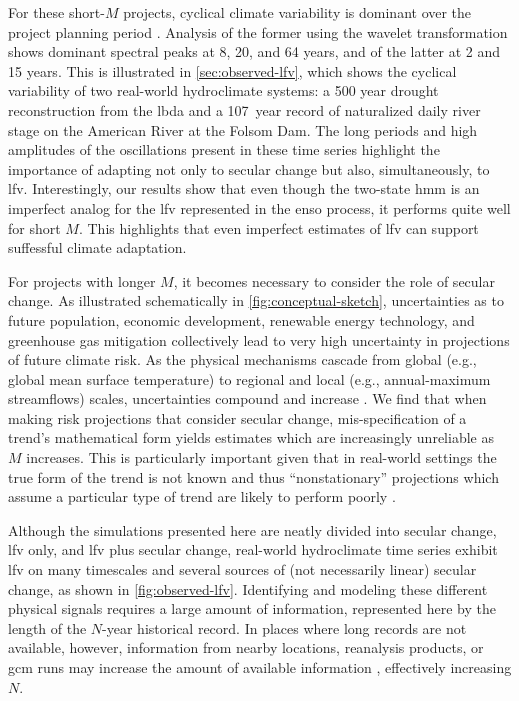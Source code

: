 \documentclass[
]{agujournal2018}
\makeatletter
\newcommand{\eg}{e.g.\@\xspace}
\makeatother
\begin{document}
For these short-$M$ projects, cyclical climate variability is dominant over the project planning period \citep{Hodgkins:2017hw, Jain:2001hz}.
Analysis of the former using the wavelet transformation \citep{Torrence:1998jp} shows dominant spectral peaks at 8, 20, and 64 years, and of the latter at 2 and 15 years.
This is illustrated in \cref{sec:observed-lfv}, which shows the cyclical variability of two real-world hydroclimate systems: a 500 year drought reconstruction from the \gls{lbda} \citep{Cook:2010bz} and a \SI{107}{year} record of naturalized daily river stage on the American River at the Folsom Dam.
The long periods and high amplitudes of the oscillations present in these time series highlight the importance of adapting not only to secular change but also, simultaneously, to \gls{lfv}.
Interestingly, our results show that even though the two-state \gls{hmm} is an imperfect analog for the \gls{lfv} represented in the \gls{enso} process, it performs quite well for short $M$.
This highlights that even imperfect estimates of \gls{lfv} can support suffessful climate adaptation.

For projects with longer $M$, it becomes necessary to consider the role of secular change.
As illustrated schematically in \cref{fig:conceptual-sketch}, uncertainties as to future population, economic development, renewable energy technology, and greenhouse gas mitigation collectively lead to very high uncertainty in projections of future climate risk.
As the physical mechanisms cascade from global (\eg, global mean surface temperature) to regional  \citep[\eg, storm track position][]{Barnes:2015gl} and local (\eg, annual-maximum streamflows) scales, uncertainties compound and increase \citep{Dittes:2017he}.
We find that when making risk projections that consider secular change, mis-specification of a trend's mathematical form yields estimates which are increasingly unreliable as $M$ increases.
This is particularly important given that in real-world settings the true form of the trend is not known and thus ``nonstationary'' projections which assume a particular type of trend are likely to perform poorly \citep{Montanari:2014hl, Serinaldi:2015bq}.

Although the simulations presented here are neatly divided into secular change, \gls{lfv} only, and \gls{lfv} plus secular change, real-world hydroclimate time series exhibit \gls{lfv} on many timescales and several sources of (not necessarily linear) secular change, as shown in \cref{fig:observed-lfv}.
Identifying and modeling these different physical signals requires a large amount of information, represented here by the length of the $N$-year historical record.
In places where long records are not available, however, information from nearby locations, reanalysis products, or \acrshort{gcm} runs may increase the amount of available information \citep{Merz:2008eh}, effectively increasing $N$.
\end{document}
